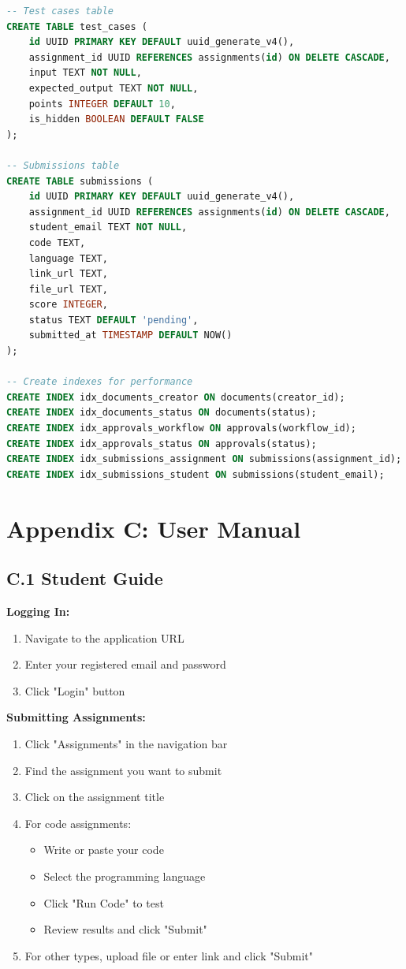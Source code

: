 \begin{lstlisting}[language=SQL, caption=Database Schema Creation, basicstyle=\ttfamily\footnotesize]
-- Test cases table
CREATE TABLE test_cases (
    id UUID PRIMARY KEY DEFAULT uuid_generate_v4(),
    assignment_id UUID REFERENCES assignments(id) ON DELETE CASCADE,
    input TEXT NOT NULL,
    expected_output TEXT NOT NULL,
    points INTEGER DEFAULT 10,
    is_hidden BOOLEAN DEFAULT FALSE
);

-- Submissions table
CREATE TABLE submissions (
    id UUID PRIMARY KEY DEFAULT uuid_generate_v4(),
    assignment_id UUID REFERENCES assignments(id) ON DELETE CASCADE,
    student_email TEXT NOT NULL,
    code TEXT,
    language TEXT,
    link_url TEXT,
    file_url TEXT,
    score INTEGER,
    status TEXT DEFAULT 'pending',
    submitted_at TIMESTAMP DEFAULT NOW()
);

-- Create indexes for performance
CREATE INDEX idx_documents_creator ON documents(creator_id);
CREATE INDEX idx_documents_status ON documents(status);
CREATE INDEX idx_approvals_workflow ON approvals(workflow_id);
CREATE INDEX idx_approvals_status ON approvals(status);
CREATE INDEX idx_submissions_assignment ON submissions(assignment_id);
CREATE INDEX idx_submissions_student ON submissions(student_email);
\end{lstlisting}

\section{Appendix C: User Manual}

\subsection{C.1 Student Guide}

\textbf{Logging In:}
\begin{enumerate}
\item Navigate to the application URL
\item Enter your registered email and password
\item Click "Login" button
\end{enumerate}

\textbf{Submitting Assignments:}
\begin{enumerate}
\item Click "Assignments" in the navigation bar
\item Find the assignment you want to submit
\item Click on the assignment title
\item For code assignments:
    \begin{itemize}
    \item Write or paste your code
    \item Select the programming language
    \item Click "Run Code" to test
    \item Review results and click "Submit"
    \end{itemize}
\item For other types, upload file or enter link and click "Submit"
\end{enumerate}

